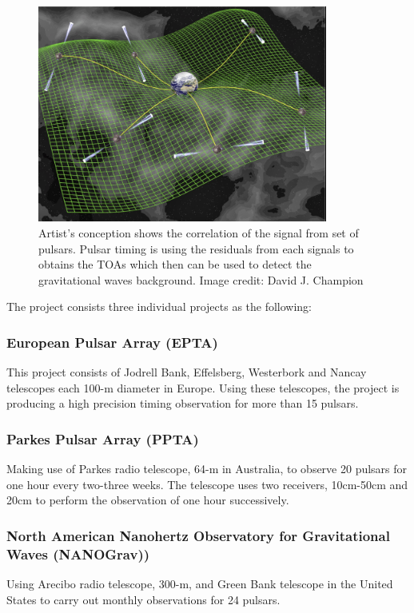 \begin{figure}[htbp!] 
\centering    
\includegraphics[width=0.85\textwidth]{pt11.png}
\caption[Pulsar timing]{Artist's conception shows the correlation of the signal from set of pulsars. Pulsar timing is using the residuals from each signals to obtains the TOAs which then can be used to detect the gravitational waves background. Image credit: David J. Champion }
\label{fig:pulsar timing}
\end{figure}


The project consists three individual projects as the following: 
\subsubsection*{European Pulsar Array (EPTA)}
This project consists of Jodrell Bank, Effelsberg, Westerbork and Nancay telescopes each 100-m diameter in Europe. Using these telescopes, the project is producing a high precision timing observation for more than 15 pulsars.

\subsubsection*{Parkes Pulsar Array (PPTA)}
Making use of Parkes radio telescope, 64-m in Australia, to observe 20 pulsars for one hour every two-three weeks. The telescope uses two receivers, 10cm-50cm and 20cm to perform the observation of one hour successively.

\subsubsection*{North American Nanohertz Observatory for Gravitational Waves (NANOGrav))}
Using Arecibo radio telescope, 300-m, and Green Bank telescope in the United States to carry out monthly observations for 24 pulsars.\\


